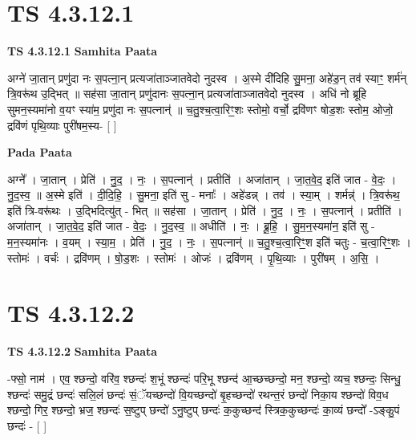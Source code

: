 \documentclass[17pt]{extarticle}
\begin{document}

\section{ TS 4.3.12.1 }

\textbf{TS 4.3.12.1 } \newline
\textbf{Samhita Paata} \newline

अग्ने॑ जा॒तान् प्रणु॑दा नः स॒पत्ना॒न् प्रत्यजा॑ताञ्जातवेदो नुदस्व । अ॒स्मे दी॑दिहि सु॒मना॒ अहे॑ड॒न् तव॑ स्याꣳ॒॒ शर्म॑न् त्रि॒वरू॑थ उ॒द्भित् ॥ सह॑सा जा॒तान् प्रणु॑दानः स॒पत्ना॒न् प्रत्यजा॑ताञ्जातवेदो नुदस्व । अधि॑ नो ब्रूहि सुमन॒स्यमा॑नो व॒यꣳ स्या॑म॒ प्रणु॑दा नः स॒पत्नान्॑ ॥ च॒तु॒श्च॒त्वा॒रिꣳ॒॒शः स्तोमो॒ वर्चो॒ द्रवि॑णꣳ षोड॒शः स्तोम॒ ओजो॒ द्रवि॑णं पृथि॒व्याः पुरी॑षम॒स्य- [  ] \newline

\textbf{Pada Paata} \newline

अग्ने᳚ । जा॒तान् । प्रेति॑ । नु॒द॒ । नः॒ । स॒पत्नान्॑ । प्रतीति॑ । अजा॑तान् । जा॒त॒वे॒द॒ इति॑ जात - वे॒दः॒ । नु॒द॒स्व॒ ॥ अ॒स्मे इति॑ । दी॒दि॒हि॒ । सु॒मना॒ इति॑ सु - मनाः᳚ । अहे॑डन्न् । तव॑ । स्या॒म् । शर्मन्न्॑ । त्रि॒वरू॑थ॒ इति॑ त्रि-वरू॑थः । उ॒द्भिदित्यु॑त् - भित् ॥ सह॑सा । जा॒तान् । प्रेति॑ । नु॒द॒ । नः॒ । स॒पत्नान्॑ । प्रतीति॑ । अजा॑तान् । जा॒त॒वे॒द॒ इति॑ जात - वे॒दः॒ । नु॒द॒स्व॒ ॥ अधीति॑ । नः॒ । ब्रू॒हि॒ । सु॒म॒न॒स्यमा॑न॒ इति॑ सु - म॒न॒स्यमा॑नः । व॒यम् । स्या॒म॒ । प्रेति॑ । नु॒द॒ । नः॒ । स॒पत्नान्॑ ॥ च॒तु॒श्च॒त्वा॒रिꣳ॒॒श इति॑ चतुः - च॒त्वा॒रिꣳ॒॒शः । स्तोमः॑ । वर्चः॑ । द्रवि॑णम् । षो॒ड॒शः । स्तोमः॑ । ओजः॑ । द्रवि॑णम् । पृ॒थि॒व्याः । पुरी॑षम् । अ॒सि॒ ।  \newline





\section{ TS 4.3.12.2 }

\textbf{TS 4.3.12.2 } \newline
\textbf{Samhita Paata} \newline

-फ्सो॒ नाम॑ । एव॒ श्छन्दो॒ वरि॑व॒ श्छन्दः॑ श॒भूं श्छन्दः॑ परि॒भू श्छन्द॑ आ॒च्छच्छन्दो॒ मन॒ श्छन्दो॒ व्यच॒ श्छन्दः॒ सिन्धु॒ श्छन्दः॑ समु॒द्रं छन्दः॑ सलि॒लं छन्दः॑ सं॒ॅयच्छन्दो॑ वि॒यच्छन्दो॑ बृ॒हच्छन्दो॑ रथन्त॒रं छन्दो॑ निका॒य श्छन्दो॑ विव॒ध श्छन्दो॒ गिर॒ श्छन्दो॒ भ्रज॒ श्छन्दः॑ स॒ष्टुप् छन्दो॑ ऽनु॒ष्टुप् छन्दः॑ क॒कुच्छन्द॑ स्त्रिक॒कुच्छन्दः॑ का॒व्यं छन्दो᳚ -ऽङ्कु॒पं छन्दः॑ - [  ] \newline
\end{document}

